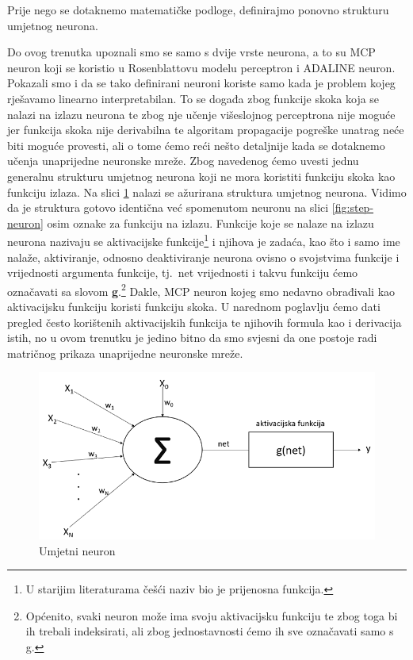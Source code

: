 \documentclass[times, utf8, zavrsni]{fer}
\begin{document}
Prije nego se dotaknemo matematičke podloge, definirajmo ponovno strukturu umjetnog neurona.

Do ovog trenutka upoznali smo se samo s dvije vrste neurona, a to su MCP neuron koji se koristio u Rosenblattovu modelu perceptron i ADALINE neuron. Pokazali smo i da se tako definirani neuroni koriste samo kada je problem kojeg rješavamo linearno interpretabilan. To se događa zbog funkcije skoka koja se nalazi na izlazu neurona te zbog nje učenje višeslojnog perceptrona nije moguće jer funkcija skoka nije derivabilna te algoritam propagacije pogreške unatrag neće biti moguće provesti, ali o tome ćemo reći nešto detaljnije kada se dotaknemo učenja unaprijedne neuronske mreže. Zbog navedenog ćemo uvesti jednu generalnu strukturu umjetnog neurona koji ne mora koristiti funkciju skoka kao funkciju izlaza. Na slici \ref{fig:ai-neuron} nalazi se ažurirana struktura umjetnog neurona. Vidimo da je struktura gotovo identična već spomenutom neuronu na slici \ref{fig:step-neuron} osim oznake za funkciju na izlazu. Funkcije koje se nalaze na izlazu neurona nazivaju se aktivacijske funkcije\footnote{U starijim literaturama češći naziv bio je prijenosna funkcija.} i njihova je zadaća, kao što i samo ime nalaže, aktiviranje, odnosno deaktiviranje neurona ovisno o svojstvima funkcije i vrijednosti argumenta funkcije, tj.\ net vrijednosti i takvu funkciju ćemo označavati sa slovom \textbf{g}.\footnote{Općenito, svaki neuron može ima svoju aktivacijsku funkciju te zbog toga bi ih trebali indeksirati, ali zbog jednostavnosti ćemo ih sve označavati samo s g.} Dakle, MCP neuron kojeg smo nedavno obrađivali kao aktivacijsku funkciju koristi funkciju skoka. U narednom poglavlju ćemo dati pregled često korištenih aktivacijskih funkcija te njihovih formula kao i derivacija istih, no u ovom trenutku je jedino bitno da smo svjesni da one postoje radi matričnog prikaza unaprijedne neuronske mreže.

\begin{figure}[H]
    \centering
    \includegraphics[scale=0.6]{img/ai-neuron.png}
    \caption[Caption for LOF]{Umjetni neuron\footnotemark}
    \label{fig:ai-neuron}
\end{figure}
\end{document}
